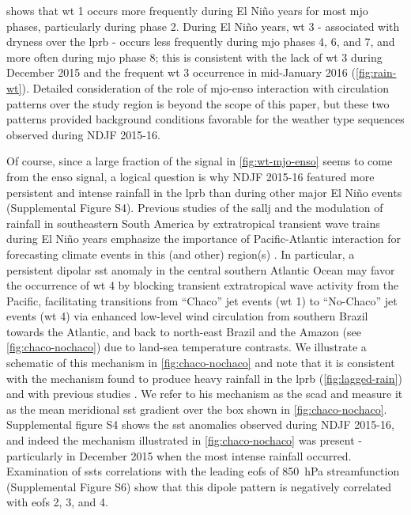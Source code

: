 \documentclass{ametsoc}
\begin{document}
 shows that \gls{wt} 1 occurs more frequently during El Ni\~{n}o years for most \gls{mjo} phases, particularly during phase 2.
During El Ni\~no years, \gls{wt} 3 - associated with dryness over the \gls{lprb} - occurs less frequently during \gls{mjo} phases 4, 6, and 7, and more often during \gls{mjo} phase 8; this is consistent with the lack of \gls{wt} 3 during December 2015 and the frequent \gls{wt} 3 occurrence in mid-January 2016 (\cref{fig:rain-wt}).
Detailed consideration of the role of \gls{mjo}-\gls{enso} interaction with circulation patterns over the study region is beyond the scope of this paper, but these two patterns provided background conditions favorable for the weather type sequences observed during NDJF 2015-16.

Of course, since a large fraction of the signal in \cref{fig:wt-mjo-enso} seems to come from the \gls{enso} signal, a logical question is why NDJF 2015-16 featured more persistent and intense rainfall in the \gls{lprb} than during other major El Ni\~no events (Supplemental Figure S4).
Previous studies of the \gls{sallj} \citep[e.g.,][]{Vera2006} and the modulation of rainfall in southeastern South America by extratropical transient wave trains during El Ni\~no years emphasize the importance of Pacific-Atlantic interaction for forecasting climate events in this (and other) region(s) \citep{Barreiro2017}.
In particular, a persistent dipolar \gls{sst} anomaly in the central southern Atlantic Ocean may favor the occurrence of \gls{wt} 4 by blocking transient extratropical wave activity from the Pacific, facilitating transitions from ``Chaco'' jet events (\gls{wt} 1) to ``No-Chaco'' jet events (\gls{wt} 4) via enhanced low-level wind circulation from southern Brazil towards the Atlantic, and back to north-east Brazil and the Amazon (see \cref{fig:chaco-nochaco}) due to land-sea temperature contrasts.
We illustrate a schematic of this mechanism in \cref{fig:chaco-nochaco} and note that it is consistent with the mechanism found to produce heavy rainfall in the \gls{lprb} (\cref{fig:lagged-rain}) and with previous studies \citep[e.g.,][]{Salio2002,Liebmann2004,Vera2006}.
We refer to his mechanism as the \gls{scad} and measure it as the mean meridional \gls{sst} gradient over the box shown in \cref{fig:chaco-nochaco}.
Supplemental figure S4 shows the \gls{sst} anomalies observed during NDJF 2015-16, and indeed the mechanism illustrated in \cref{fig:chaco-nochaco} was present - particularly in December 2015 when the most intense rainfall occurred.
Examination of \glspl{sst} correlations with the leading \glspl{eof} of \SI{850}{\hecto\pascal} streamfunction (Supplemental Figure S6) show that this dipole pattern is negatively correlated with \glspl{eof} 2, 3, and 4.
\end{document}
